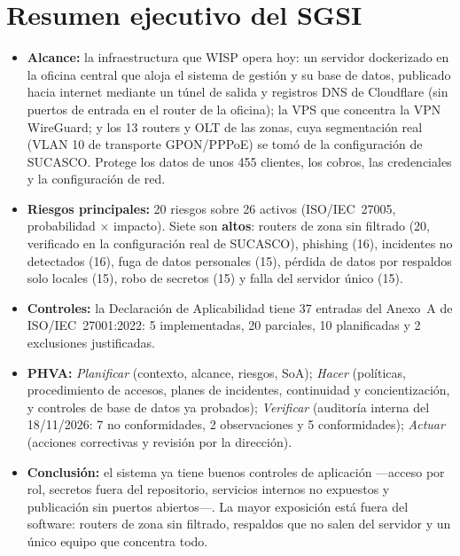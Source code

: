 \section{Resumen ejecutivo del SGSI}

\begin{itemize}
  \item \textbf{Alcance:} la infraestructura que WISP opera hoy: un servidor dockerizado en
  la oficina central que aloja el sistema de gestión y su base de datos, publicado hacia
  internet mediante un túnel de salida y registros DNS de Cloudflare (sin puertos de
  entrada en el router de la oficina); la VPS que
  concentra la VPN WireGuard; y los 13 routers y OLT de las zonas, cuya segmentación real (VLAN 10 de transporte GPON/PPPoE)
  se tomó de la configuración de SUCASCO. Protege los datos de
  unos 455 clientes, los cobros, las credenciales y la configuración de red.
  \item \textbf{Riesgos principales:} 20 riesgos sobre 26 activos (ISO/IEC~27005,
  probabilidad $\times$ impacto). Siete son \textbf{altos}: routers de zona sin filtrado
  (20, verificado en la configuración real de SUCASCO), phishing (16), incidentes no
  detectados (16), fuga de datos personales (15), pérdida de datos por respaldos solo
  locales (15), robo de secretos (15) y falla del servidor único (15).
  \item \textbf{Controles:} la Declaración de Aplicabilidad tiene 37 entradas del Anexo~A de
  ISO/IEC~27001:2022: 5 implementadas, 20 parciales, 10 planificadas y 2 exclusiones
  justificadas.
  \item \textbf{PHVA:} \emph{Planificar} (contexto, alcance, riesgos, SoA);
  \emph{Hacer} (políticas, procedimiento de accesos, planes de incidentes, continuidad y
  concientización, y controles de base de datos ya probados); \emph{Verificar}
  (auditoría interna del 18/11/2026: 7 no conformidades, 2 observaciones y 5
  conformidades); \emph{Actuar} (acciones correctivas y revisión por la dirección).
  \item \textbf{Conclusión:} el sistema ya tiene buenos controles de aplicación ---acceso
  por rol, secretos fuera del repositorio, servicios internos no expuestos y publicación
  sin puertos abiertos---. La mayor exposición está fuera del software: routers de zona
  sin filtrado, respaldos que no salen del servidor y un único equipo que concentra todo.
\end{itemize}

